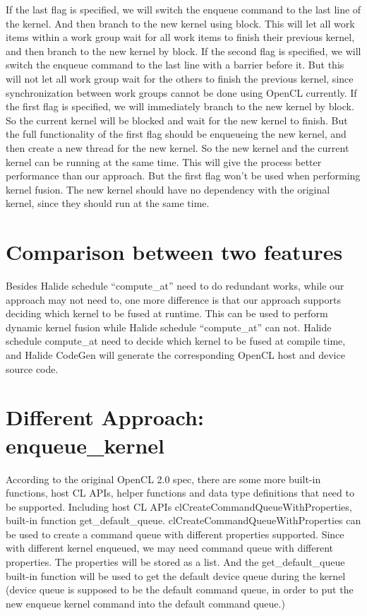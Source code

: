     If the last flag is specified, we will switch the enqueue command to the last line of the kernel. And then branch to the new kernel using block. This will let all work items within a work group wait for all work items to finish their previous kernel, and then branch to the new kernel by block.
    If the second flag is specified, we will switch the enqueue command to the last line with a barrier before it. But this will not let all work group wait for the others to finish the previous kernel, since synchronization between work groups cannot be done using OpenCL currently.
    If the first flag is specified, we will immediately branch to the new kernel by block. So the current kernel will be blocked and wait for the new kernel to finish. But the full functionality of the first flag should be enqueueing the new kernel, and then create a new thread for the new kernel. So the new kernel and the current kernel can be running at the same time. This will give the process better performance than our approach. But the first flag won’t be used when performing kernel fusion. The new kernel should have no dependency with the original kernel, since they should run at the same time.
	
\section{Comparison between two features}
    Besides Halide schedule “compute\_at” need to do redundant works, while our approach may not need to, one more difference is that our approach supports deciding which kernel to be fused at runtime. This can be used to perform dynamic kernel fusion while Halide schedule “compute\_at” can not. Halide schedule compute\_at need to decide which kernel to be fused at compile time, and Halide CodeGen will generate the corresponding OpenCL host and device source code.

\section{Different Approach: enqueue\_kernel}
    According to the original OpenCL 2.0 spec, there are some more built-in functions, host CL APIs, helper functions and data type definitions that need to be supported. Including host CL APIs clCreateCommandQueueWithProperties, built-in function get\_default\_queue. 
    clCreateCommandQueueWithProperties can be used to create a command queue with different properties supported. Since with different kernel enqueued, we may need command queue with different properties. The properties will be stored as a list. And the get\_default\_queue built-in function will be used to get the default device queue during the kernel (device queue is supposed to be the default command queue, in order to put the new enqueue kernel command into the default command queue.) 
	
